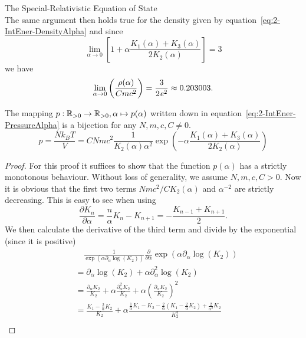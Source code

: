 \begin{subsection}{The Special-Relativistic Equation of State}
\begin{equation}
	\label{eq:2-IntEner-PressureAlpha-Limit}
\end{equation}
The same argument then holds true for the density given by equation~\eqref{eq:2-IntEner-DensityAlpha} and since
\begin{equation}
	\lim\limits_{\alpha\to0}\left[1+\alpha\frac{K_1(\alpha)+K_3(\alpha)}{2K_2(\alpha)}\right] = 3
	\label{eq:2-IntEner-Limit-Alpha}
\end{equation}
we have
\begin{equation}
	\lim\limits_{\alpha\to0}\left(\frac{\rho(\alpha)}{Cmc^2}\right) = \frac{3}{2\mathit{e}^2} \approx 0.203003.
	\label{eq:2-IntEner-Limit-Alpha-2}
\end{equation}
%
%
\begin{theorem}
	The mapping $p:\mathbb{R}_{>0}\rightarrow \mathbb{R}_{>0},\alpha\mapsto p(\alpha)$ written down in equation~\eqref{eq:2-IntEner-PressureAlpha} is a bijection for any $N,m,c,C\neq0$.
	\begin{equation}
		p = \frac{Nk_B T}{V} = CNmc^2\frac{1}{K_2(\alpha)\alpha^2}\exp\left(-\alpha\frac{K_1(\alpha)+K_3(\alpha)}{2K_2(\alpha)}\right)
		\label{eq:2-IntEner-Pressure-Alpha-Dependence}
	\end{equation}
\end{theorem}
\begin{proof}
	For this proof it suffices to show that the function $p(\alpha)$ has a strictly monotonous behaviour.
	Without loss of generality, we assume $N,m,c,C>0$.
	Now it is obvious that the first two terms $Nmc^2/CK_2(\alpha)$ and $\alpha^{-2}$ are strictly decreasing.
	This is easy to see when using~\cite{abramowitzPocketbookMathematicalFunctions1984}
	\begin{equation}
		\frac{\partial K_n}{\partial\alpha} = \frac{n}{\alpha}K_n-K_{n+1} = -\frac{K_{n-1}+K_{n+1}}{2}.
		\label{eq:2-IntEner-BesselDerivative}
	\end{equation}
	We then calculate the derivative of the third term and divide by the exponential (since it is positive)
	\begin{align}
		&\hspace{1em} \frac{1}{\exp(\alpha\partial_\alpha\log(K_2))}\frac{\partial}{\partial\alpha}\exp(\alpha\partial_\alpha\log(K_2))\\
		&= \partial_\alpha\log(K_2) + \alpha\partial^2_\alpha\log(K_2)\\
		&= \frac{\partial_\alpha K_2}{K_2} + \alpha\frac{\partial^2_\alpha K_2}{K_2} + \alpha\left(\frac{\partial_\alpha K_2}{K_2}\right)^2\\
		&= \frac{K_1-\frac{2}{\alpha}K_2}{K_2} + \alpha\frac{\frac{1}{\alpha}K_1-K_2-\frac{2}{\alpha}\left(K_1-\frac{2}{\alpha}K_2\right)+\frac{2}{\alpha^2}K_2}{K_2^2}\\

\end{align}
\end{proof}
\end{subsection}
